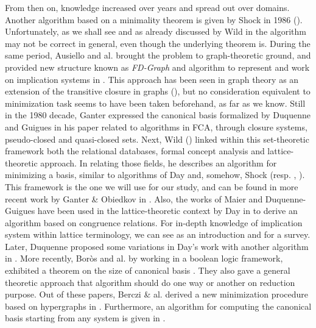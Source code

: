 \vspace{1.2em}

From then on, knowledge increased over years and spread out over domains. 
Another algorithm based on a minimality theorem is given by Shock in 1986 
(\cite{shock_computing_1986}). Unfortunately, as we shall see and as already 
discussed by Wild in \cite{wild_computations_1995} the algorithm may not be
correct in general, even though the underlying theorem is. During the same 
period, Ausiello and al. brought the problem to graph-theoretic ground, and 
provided new structure known as \textit{FD-Graph} and algorithm to represent 
and work on implication systems in \cite{ausiello_directed_2017, 
	ausiello_graph_1983, ausiello_minimal_1986}. This approach has been seen in 
graph theory as an extension of the transitive closure in graphs 
(\cite{aho_transitive_2006}), but no consideration equivalent to minimization 
task seems to have been taken beforehand, as far as we know. Still in the 1980 
decade, Ganter expressed the canonical basis formalized by Duquenne and Guigues 
in his paper related to algorithms in FCA, \cite{ganter_two_2010} through 
closure systems, pseudo-closed and quasi-closed sets. Next, Wild 
(\cite{wild_implicational_1989, wild_theory_1994, wild_computations_1995}) 
linked within this set-theoretic framework both the relational databases, 
formal concept analysis and lattice-theoretic approach. In relating those 
fields, he describes an algorithm for minimizing a basis, similar to algorithms 
of Day and, somehow, Shock (resp. \cite{day_lattice_1992},  
\cite{shock_computing_1986}). This framework is the one we will use for our 
study, and can be found in more recent work by Ganter \& Obiedkov in 
\cite{b._ganter_conceptual_2016}. Also, the works of Maier and Duquenne-Guigues 
have been used in the lattice-theoretic context by Day in 
\cite{day_lattice_1992} to derive an algorithm based on congruence relations. 
For in-depth knowledge of implication system within lattice terminology, we can 
see \cite{davey_introduction_2002} as an introduction and 
\cite{bertet_lattices_2016} for a survey. Later, Duquenne proposed some 
variations in Day's work with another algorithm in 
\cite{duquenne_variations_2007}. More recently, Bor\`os and al. by 
working in a boolean logic framework, exhibited a theorem on the size of
canonical basis \cite{boros_exclusive_2010, boros_strong_2017}. They also gave
a general theoretic approach that algorithm should do one way or another on
reduction purpose. Out of these papers, Berczi \& al. derived a new 
minimization procedure based on hypergraphs in \cite{berczi_directed_2017}. 
Furthermore, an algorithm for computing the canonical basis starting from any 
system is given in \cite{b._ganter_conceptual_2016}.

